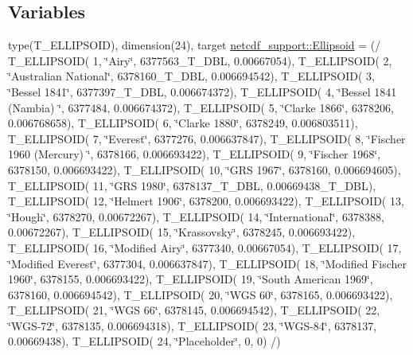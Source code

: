 \subsection*{Variables}
\begin{DoxyCompactItemize}
\item 
type(T\_\-ELLIPSOID), dimension(24), target \hyperlink{namespacenetcdf__support_ad7768781e3e21a9e3d534c4f2c551a8f}{netcdf\_\-support::Ellipsoid} = (/ T\_\-ELLIPSOID( 1, \char`\"{}Airy\char`\"{}, 6377563\_\-T\_\-DBL, 0.00667054), T\_\-ELLIPSOID( 2, \char`\"{}Australian National\char`\"{}, 6378160\_\-T\_\-DBL, 0.006694542), T\_\-ELLIPSOID( 3, \char`\"{}Bessel 1841\char`\"{}, 6377397\_\-T\_\-DBL, 0.006674372), T\_\-ELLIPSOID( 4, \char`\"{}Bessel 1841 (Nambia) \char`\"{}, 6377484, 0.006674372), T\_\-ELLIPSOID( 5, \char`\"{}Clarke 1866\char`\"{}, 6378206, 0.006768658), T\_\-ELLIPSOID( 6, \char`\"{}Clarke 1880\char`\"{}, 6378249, 0.006803511), T\_\-ELLIPSOID( 7, \char`\"{}Everest\char`\"{}, 6377276, 0.006637847), T\_\-ELLIPSOID( 8, \char`\"{}Fischer 1960 (Mercury) \char`\"{}, 6378166, 0.006693422), T\_\-ELLIPSOID( 9, \char`\"{}Fischer 1968\char`\"{}, 6378150, 0.006693422), T\_\-ELLIPSOID( 10, \char`\"{}GRS 1967\char`\"{}, 6378160, 0.006694605), T\_\-ELLIPSOID( 11, \char`\"{}GRS 1980\char`\"{}, 6378137\_\-T\_\-DBL, 0.00669438\_\-T\_\-DBL), T\_\-ELLIPSOID( 12, \char`\"{}Helmert 1906\char`\"{}, 6378200, 0.006693422), T\_\-ELLIPSOID( 13, \char`\"{}Hough\char`\"{}, 6378270, 0.00672267), T\_\-ELLIPSOID( 14, \char`\"{}International\char`\"{}, 6378388, 0.00672267), T\_\-ELLIPSOID( 15, \char`\"{}Krassovsky\char`\"{}, 6378245, 0.006693422), T\_\-ELLIPSOID( 16, \char`\"{}Modified Airy\char`\"{}, 6377340, 0.00667054), T\_\-ELLIPSOID( 17, \char`\"{}Modified Everest\char`\"{}, 6377304, 0.006637847), T\_\-ELLIPSOID( 18, \char`\"{}Modified Fischer 1960\char`\"{}, 6378155, 0.006693422), T\_\-ELLIPSOID( 19, \char`\"{}South American 1969\char`\"{}, 6378160, 0.006694542), T\_\-ELLIPSOID( 20, \char`\"{}WGS 60\char`\"{}, 6378165, 0.006693422), T\_\-ELLIPSOID( 21, \char`\"{}WGS 66\char`\"{}, 6378145, 0.006694542), T\_\-ELLIPSOID( 22, \char`\"{}WGS-\/72\char`\"{}, 6378135, 0.006694318), T\_\-ELLIPSOID( 23, \char`\"{}WGS-\/84\char`\"{}, 6378137, 0.00669438), T\_\-ELLIPSOID( 24, \char`\"{}Placeholder\char`\"{}, 0, 0) /)
\end{DoxyCompactItemize}
